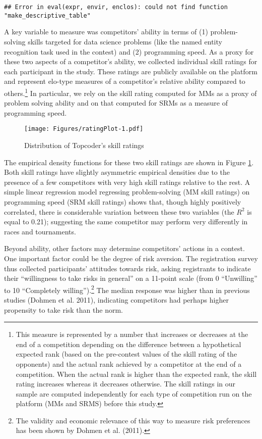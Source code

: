 \documentclass[11pt, titlepage]{article}
\begin{document}
\begin{verbatim}
## Error in eval(expr, envir, enclos): could not find function "make_descriptive_table"
\end{verbatim}

A key variable to measure was competitors' ability in terms of (1)
problem-solving skills targeted for data science problems (like the
named entity recognition task used in the contest) and (2) programming
speed. As a proxy for these two aspects of a competitor's ability, we
collected individual skill ratings for each participant in the study.
These ratings are publicly available on the platform and represent
elo-type measures of a competitor's relative ability compared to
others.\footnote{This measure is represented by a number that increases
  or decreases at the end of a competition depending on the difference
  between a hypothetical expected rank (based on the pre-contest values
  of the skill rating of the opponents) and the actual rank achieved by
  a competitor at the end of a competition. When the actual rank is
  higher than the expected rank, the skill rating increases whereas it
  decreases otherwise. The skill ratings in our sample are computed
  independently for each type of competition run on the platform (MMs
  and SRMS) before this study.} In particular, we rely on the skill
rating computed for MMs as a proxy of problem solving ability and on
that computed for SRMs as a measure of programming speed.

\begin{figure}
\centering
\caption{Distribution of Topcoder's skill ratings}
\label{skill ratings}
\texttt{[image: Figures/ratingPlot-1.pdf]}
\end{figure}

The empirical density functions for these two skill ratings are shown in
Figure \ref{skill ratings}. Both skill ratings have slightly asymmetric
empirical densities due to the presence of a few competitors with very
high skill ratings relative to the rest. A simple linear regression
model regressing problem-solving (MM skill ratings) on programming speed
(SRM skill ratings) shows that, though highly positively correlated,
there is considerable variation between these two variables (the \(R^2\)
is equal to 0.21); suggesting the same competitor may perform very
differently in races and tournaments.

Beyond ability, other factors may determine competitors' actions in a
contest. One important factor could be the degree of risk aversion. The
registration survey thus collected participants' attitudes towards risk,
asking registrants to indicate their ``willingness to take risks in
general'' on a 11-point scale (from 0 ``Unwilling'' to 10 ``Completely
willing'').\footnote{The validity and economic relevance of this way to
  measure risk preferences has been shown by Dohmen et al. (2011).} The
median response was higher than in previous studies (Dohmen et al.
2011), indicating competitors had perhaps higher propensity to take risk
than the norm.
\end{document}
